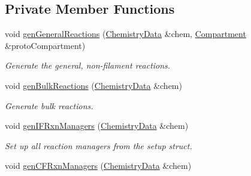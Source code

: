 \subsection*{Private Member Functions}
\begin{DoxyCompactItemize}
\item 
void \hyperlink{classSimpleManagerImpl_a99b517b17f904f2d6fd92a308b459e36}{gen\+General\+Reactions} (\hyperlink{structChemistryData}{Chemistry\+Data} \&chem, \hyperlink{classCompartment}{Compartment} \&proto\+Compartment)
\begin{DoxyCompactList}\small\item\em Generate the general, non-\/filament reactions. \end{DoxyCompactList}\item 
void \hyperlink{classSimpleManagerImpl_a7bb497c77b2eee7ee560d0259061e552}{gen\+Bulk\+Reactions} (\hyperlink{structChemistryData}{Chemistry\+Data} \&chem)
\begin{DoxyCompactList}\small\item\em Generate bulk reactions. \end{DoxyCompactList}\end{DoxyCompactItemize}
{\bf }\par
\begin{DoxyCompactItemize}
\item 
void \hyperlink{classSimpleManagerImpl_a7e196ec854f3d9dff5c930c23e0a656f}{gen\+I\+F\+Rxn\+Managers} (\hyperlink{structChemistryData}{Chemistry\+Data} \&chem)
\begin{DoxyCompactList}\small\item\em Set up all reaction managers from the setup struct. \end{DoxyCompactList}\item 
void \hyperlink{classSimpleManagerImpl_a0018d381ff3b968d74fa261ea9774dee}{gen\+C\+F\+Rxn\+Managers} (\hyperlink{structChemistryData}{Chemistry\+Data} \&chem)
\end{DoxyCompactItemize}

